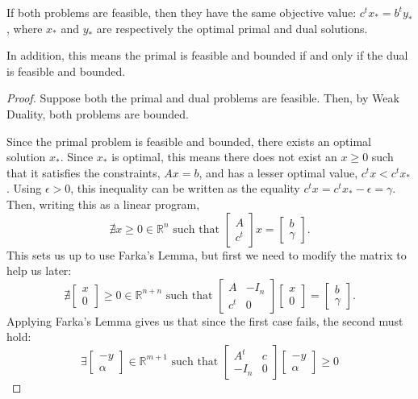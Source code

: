 \documentclass{article}
\newcommand\R{{\mathbb{R}}}
\begin{document}
\begin{theorem}
	If both problems are feasible, then they have the same objective value: $c^tx_* = b^ty_*$, where
	$x_*$ and $y_*$ are respectively the optimal primal and dual solutions.

	\noindent
	In addition, this means the primal is feasible and bounded if and only if the dual is feasible and
	bounded.
\end{theorem}
\begin{proof}
	Suppose both the primal and dual problems are feasible. Then, by Weak Duality, both problems are
	bounded.

	Since the primal problem is feasible and bounded, there exists an optimal solution $x_*$. Since
	$x_*$ is optimal, this means there does not exist an $x \ge 0$ such that it satisfies the
	constraints, $Ax = b$, and has a lesser optimal value, $c^tx < c^tx_*$. Using $\epsilon > 0$, this
	inequality can be written as the equality $c^tx = c^tx_* - \epsilon = \gamma$. Then, writing this
	as a linear program,
	\[
		\nexists x \ge 0 \in \R^n \text{ such that }
		\begin{bmatrix} A \\ c^t \end{bmatrix} x = \begin{bmatrix} b \\ \gamma \end{bmatrix}
		\text{.}
	\]
	This sets us up to use Farka's Lemma, but first we need to modify the matrix to help us later:
	\[
		\nexists \begin{bmatrix} x \\ 0 \end{bmatrix} \ge 0 \in \R^{n + n} \text{ such that }
		\begin{bmatrix} A & -I_n \\ c^t & 0 \end{bmatrix} \begin{bmatrix} x \\ 0 \end{bmatrix}
		= \begin{bmatrix} b \\ \gamma \end{bmatrix}
		\text{.}
	\]
	Applying Farka's Lemma gives us that since the first case fails, the second must hold:
	\[
		\exists \begin{bmatrix} -y \\ \alpha \end{bmatrix} \in \R^{m + 1} \text{ such that }
		\begin{bmatrix} A^t & c \\ -I_n & 0 \end{bmatrix} \begin{bmatrix} -y \\ \alpha \end{bmatrix} \ge 0
\]
\end{proof}
\end{document}

